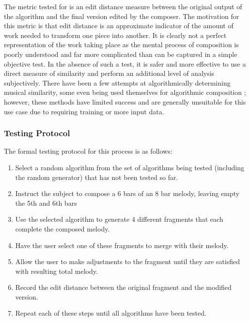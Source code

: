 \documentclass[ author={Stephen Livermore-Tozer},
				supervisor={Dr. Peter Flach},
				degree={MEng},
				title={Algorithmic Co-composition Using Machine Learning},
				subtitle={},
				type={research},
				year={2016} ]{dissertation}
\begin{document}
	The metric tested for is an edit distance measure between the original output of the algorithm and the final version edited by the composer. The motivation for this metric is that edit distance is an approximate indicator of the amount of work needed to transform one piece into another. It is clearly not a perfect representation of the work taking place as the mental process of composition is poorly understood and far more complicated than can be captured in a simple objective test. In the absence of such a test, it is safer and more effective to use a direct measure of similarity and perform an additional level of analysis subjectively. There have been a few attempts at algorithmically determining musical similarity, some even being used themselves for algorithmic composition \cite{burton1998hybrid}; however, these methods have limited success and are generally unsuitable for this use case due to requiring training or more input data.
	
	
	
	\subsubsection{Testing Protocol}
	
	The formal testing protocol for this process is as follows:
	\begin{enumerate}
		\item Select a random algorithm from the set of algorithms being tested (including the random generator) that has not been tested so far.
		\item Instruct the subject to compose a 6 bars of an 8 bar melody, leaving empty the 5th and 6th bars
		\item Use the selected algorithm to generate 4 different fragments that each complete the composed melody.
		\item Have the user select one of these fragments to merge with their melody.
		\item Allow the user to make adjustments to the fragment until they are satisfied with resulting total melody.
		\item Record the edit distance between the original fragment and the modified version.
		\item Repeat each of these steps until all algorithms have been tested.
	\end{enumerate}
	
\end{document}

